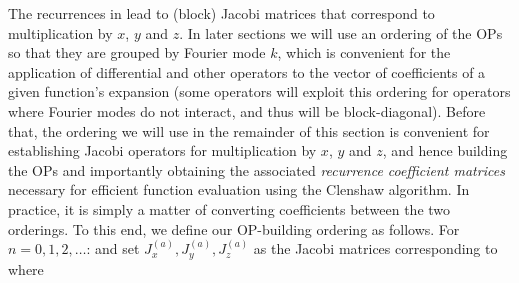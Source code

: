 The recurrences in  lead to (block) Jacobi matrices that correspond to multiplication by $x$, $y$ and $z$. In later sections we will use an ordering of the OPs so that they are grouped by Fourier mode $k$, which is convenient for the application of differential and other operators to the vector of coefficients of a given function's expansion (some operators will exploit this ordering for operators where Fourier modes do not interact, and thus will be block-diagonal). Before that, the ordering we will use in the remainder of this section is convenient for establishing Jacobi operators for multiplication by $x$, $y$ and $z$, and hence building the OPs and importantly obtaining the associated \textit{recurrence coefficient matrices} necessary for efficient function evaluation using the Clenshaw algorithm. In practice, it is simply a matter of converting coefficients between the two orderings. To this end, we define our OP-building ordering as follows. For $n=0,1,2,\dots$:  
and set $ J_x^{(a)},  J_y^{(a)},  J_z^{(a)}$ as the Jacobi matrices corresponding to
where
